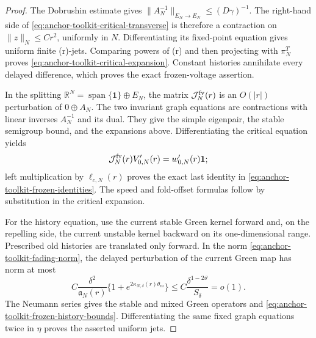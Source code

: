 \begin{proof}
The Dobrushin estimate gives
\(\|A_N^{-1}\|_{E_N\to E_N}\le(D\gamma)^{-1}\).  The right-hand side of
\cref{eq:anchor-toolkit-critical-transverse} is therefore a contraction on
\(\|z\|_N\le Cr^2\), uniformly in \(N\).  Differentiating its fixed-point
equation gives uniform finite (r)-jets.  Comparing powers of (r) and
then projecting with \(\pi_N^T\) proves
\cref{eq:anchor-toolkit-critical-expansion}.  Constant histories annihilate
every delayed difference, which proves the exact frozen-voltage assertion.

In the splitting
\(\mathbb R^N=\operatorname{span}\{\mathbf1\}\oplus E_N\), the matrix
\(\mathcal J_N^{\rm fv}(r)\) is an \(O(|r|)\) perturbation of
\(0\oplus A_N\).  The two invariant graph equations are contractions with
linear inverses \(A_N^{-1}\) and its dual.  They give the simple eigenpair,
the stable semigroup bound, and the expansions above.  Differentiating the
critical equation yields
\[
 \mathcal J_N^{\rm fv}(r)V_{0,N}'(r)=w_{0,N}'(r)\mathbf1;
\]
left multiplication by \(\ell_{c,N}(r)\) proves the exact last identity in
\cref{eq:anchor-toolkit-frozen-identities}.  The speed and fold-offset
formulas follow by substitution in the critical expansion.

For the history equation, use the current stable Green kernel forward and,
on the repelling side, the current unstable kernel backward on its
one-dimensional range.  Prescribed old histories are translated only
forward.  In the norm \cref{eq:anchor-toolkit-fading-norm}, the delayed
perturbation of the current Green map has norm at most
\[
 C\frac{\delta^2}{\mathfrak a_N(r)}
       \{1+e^{2\kappa_{N,\delta}(r)\theta_m}\}
 \le C\frac{\delta^{1-2\vartheta}}{S_\delta}=o(1).
\]
The Neumann series gives the stable and mixed Green operators and
\cref{eq:anchor-toolkit-frozen-history-bounds}.  Differentiating the same
fixed graph equations twice in \(\eta\) proves the asserted uniform jets.
\end{proof}

